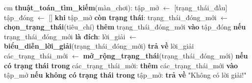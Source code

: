  cm
\textbf{thuật\_toán\_tìm\_kiếm}(màn\_chơi): \newline
\indent\indent tập\_mở $\gets$ [trạng\_thái\_đầu] \newline
\indent\indent tập\_đóng $\gets$ [] \newline
\indent\indent \textbf{khi} tập\_mở \textbf{còn trạng thái}: \newline
\indent\indent\indent trạng\_thái\_đóng\_mới $\gets$ \textbf{chọn\_trạng\_thái}(tiêu\_chí) \newline
\indent\indent\indent \textbf{thêm} trạng\_thái\_đóng\_mới \textbf{vào} tập\_đóng \newline
\indent\indent\indent \textbf{nếu} trạng\_thái\_đóng\_mới \textbf{là đích}: \newline
\indent\indent\indent\indent lời\_giải $\gets$ \textbf{biểu\_diễn\_lời\_giải}(trạng\_thái\_đóng\_mới) \newline
\indent\indent\indent\indent \textbf{trả về} lời\_giải \newline
\indent\indent\indent các\_trạng\_thái\_mới $\gets$ \textbf{mở\_rộng\_trạng\_thái}(trạng\_thái\_đóng\_mới) \newline
\indent\indent\indent \textbf{nếu có trạng thái trong}  các\_trạng\_thái\_mới: \newline
\indent\indent\indent\indent \textbf{thêm} các\_trạng\_thái\_mới \textbf{vào} tập\_mở \newline
\indent\indent\indent \textbf{nếu không có trạng thái trong} tập\_mở: \newline
\indent\indent\indent\indent \textbf{trả về} "Không có lời giải!" \newline

\newpage